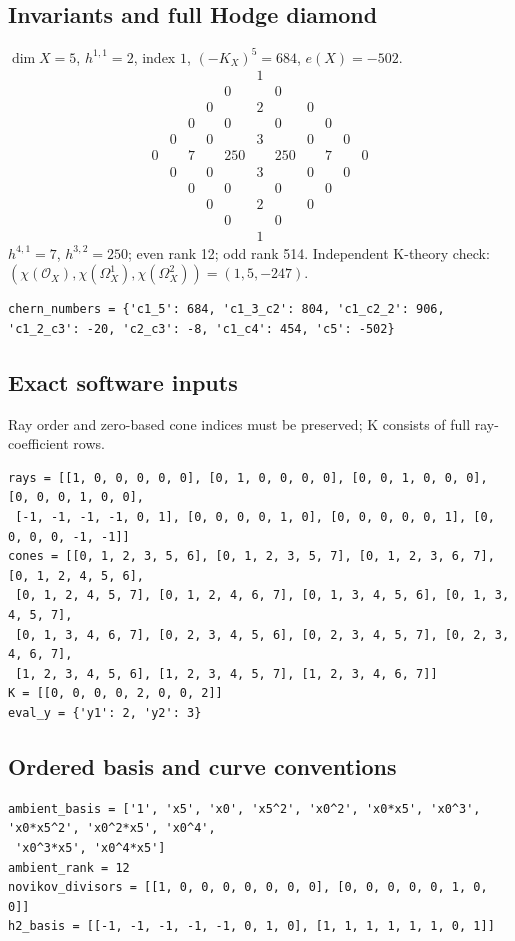 \documentclass[10pt,a4paper]{article}
\begin{document}
\subsection*{Invariants and full Hodge diamond}
$\dim X=5$, $h^{1,1}=2$, index $1$, $(-K_X)^5=684$, $e(X)=-502$.
\[\begin{array}{ccccccccccc}&&&&&1&&&&&\\&&&&0&&0&&&&\\&&&0&&2&&0&&&\\&&0&&0&&0&&0&&\\&0&&0&&3&&0&&0&\\0&&7&&250&&250&&7&&0\\&0&&0&&3&&0&&0&\\&&0&&0&&0&&0&&\\&&&0&&2&&0&&&\\&&&&0&&0&&&&\\&&&&&1&&&&&\end{array}\]
$h^{4,1}=7$, $h^{3,2}=250$; even rank 12; odd rank 514.
Independent K-theory check: $(\chi(\mathcal O_X),\chi(\Omega_X^1),\chi(\Omega_X^2))=(1, 5, -247)$.
\begin{lstlisting}
chern_numbers = {'c1_5': 684, 'c1_3_c2': 804, 'c1_c2_2': 906, 'c1_2_c3': -20, 'c2_c3': -8, 'c1_c4': 454, 'c5': -502}
\end{lstlisting}
\subsection*{Exact software inputs}
Ray order and zero-based cone indices must be preserved; K consists of full ray-coefficient rows.
\begin{lstlisting}
rays = [[1, 0, 0, 0, 0, 0], [0, 1, 0, 0, 0, 0], [0, 0, 1, 0, 0, 0], [0, 0, 0, 1, 0, 0],
 [-1, -1, -1, -1, 0, 1], [0, 0, 0, 0, 1, 0], [0, 0, 0, 0, 0, 1], [0, 0, 0, 0, -1, -1]]
cones = [[0, 1, 2, 3, 5, 6], [0, 1, 2, 3, 5, 7], [0, 1, 2, 3, 6, 7], [0, 1, 2, 4, 5, 6],
 [0, 1, 2, 4, 5, 7], [0, 1, 2, 4, 6, 7], [0, 1, 3, 4, 5, 6], [0, 1, 3, 4, 5, 7],
 [0, 1, 3, 4, 6, 7], [0, 2, 3, 4, 5, 6], [0, 2, 3, 4, 5, 7], [0, 2, 3, 4, 6, 7],
 [1, 2, 3, 4, 5, 6], [1, 2, 3, 4, 5, 7], [1, 2, 3, 4, 6, 7]]
K = [[0, 0, 0, 0, 2, 0, 0, 2]]
eval_y = {'y1': 2, 'y2': 3}
\end{lstlisting}
\subsection*{Ordered basis and curve conventions}
\begin{lstlisting}
ambient_basis = ['1', 'x5', 'x0', 'x5^2', 'x0^2', 'x0*x5', 'x0^3', 'x0*x5^2', 'x0^2*x5', 'x0^4',
 'x0^3*x5', 'x0^4*x5']
ambient_rank = 12
novikov_divisors = [[1, 0, 0, 0, 0, 0, 0, 0], [0, 0, 0, 0, 0, 1, 0, 0]]
h2_basis = [[-1, -1, -1, -1, -1, 0, 1, 0], [1, 1, 1, 1, 1, 1, 0, 1]]
\end{lstlisting}
\end{document}
